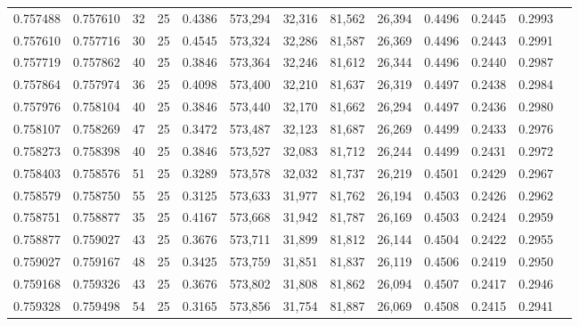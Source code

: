\begin{tabular}{rrrrrrrrrrrrr}
0.757488 & 0.757610 &    32 &  25 &                                     0.4386 & 573,294 &  32,316 &  81,562 &  26,394 & 0.4496 & 0.2445 & 0.2993 \\
0.757610 & 0.757716 &    30 &  25 &                                     0.4545 & 573,324 &  32,286 &  81,587 &  26,369 & 0.4496 & 0.2443 & 0.2991 \\
0.757719 & 0.757862 &    40 &  25 &                                     0.3846 & 573,364 &  32,246 &  81,612 &  26,344 & 0.4496 & 0.2440 & 0.2987 \\
0.757864 & 0.757974 &    36 &  25 &                                     0.4098 & 573,400 &  32,210 &  81,637 &  26,319 & 0.4497 & 0.2438 & 0.2984 \\
0.757976 & 0.758104 &    40 &  25 &                                     0.3846 & 573,440 &  32,170 &  81,662 &  26,294 & 0.4497 & 0.2436 & 0.2980 \\
0.758107 & 0.758269 &    47 &  25 &                                     0.3472 & 573,487 &  32,123 &  81,687 &  26,269 & 0.4499 & 0.2433 & 0.2976 \\
0.758273 & 0.758398 &    40 &  25 &                                     0.3846 & 573,527 &  32,083 &  81,712 &  26,244 & 0.4499 & 0.2431 & 0.2972 \\
0.758403 & 0.758576 &    51 &  25 &                                     0.3289 & 573,578 &  32,032 &  81,737 &  26,219 & 0.4501 & 0.2429 & 0.2967 \\
0.758579 & 0.758750 &    55 &  25 &                                     0.3125 & 573,633 &  31,977 &  81,762 &  26,194 & 0.4503 & 0.2426 & 0.2962 \\
0.758751 & 0.758877 &    35 &  25 &                                     0.4167 & 573,668 &  31,942 &  81,787 &  26,169 & 0.4503 & 0.2424 & 0.2959 \\
0.758877 & 0.759027 &    43 &  25 &                                     0.3676 & 573,711 &  31,899 &  81,812 &  26,144 & 0.4504 & 0.2422 & 0.2955 \\
0.759027 & 0.759167 &    48 &  25 &                                     0.3425 & 573,759 &  31,851 &  81,837 &  26,119 & 0.4506 & 0.2419 & 0.2950 \\
0.759168 & 0.759326 &    43 &  25 &                                     0.3676 & 573,802 &  31,808 &  81,862 &  26,094 & 0.4507 & 0.2417 & 0.2946 \\
0.759328 & 0.759498 &    54 &  25 &                                     0.3165 & 573,856 &  31,754 &  81,887 &  26,069 & 0.4508 & 0.2415 & 0.2941 \\

\end{tabular}
